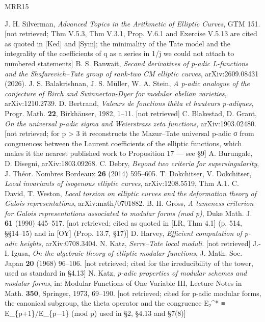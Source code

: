 \documentclass[11pt,a4paper]{article}
\theoremstyle{named}
\begin{document}
\begin{thebibliography}{MRR15}

 J. H. Silverman, \textit{Advanced Topics in the Arithmetic of Elliptic Curves}, GTM 151. [not retrieved; Thm V.5.3, Thm V.3.1, Prop. V.6.1 and Exercise V.5.13 are cited as quoted in [Ked] and [Sym]; the minimality of the Tate model and the integrality of the coefficients of q as a series in 1/j we could not attach to numbered statements]
 B. S. Banwait, \textit{Second derivatives of p-adic L-functions and the Shafarevich–Tate group of rank-two CM elliptic curves}, arXiv:2609.08431 (2026).
 J. S. Balakrishnan, J. S. Müller, W. A. Stein, \textit{A p-adic analogue of the conjecture of Birch and Swinnerton-Dyer for modular abelian varieties}, arXiv:1210.2739.
 D. Bertrand, \textit{Valeurs de fonctions thêta et hauteurs p-adiques}, Progr. Math. \textbf{22}, Birkhäuser, 1982, 1–11. [not retrieved]
 C. Blakestad, D. Grant, \textit{On the universal p-adic sigma and Weierstrass zeta functions}, arXiv:1903.02480. [not retrieved; for p \textgreater{} 3 it reconstructs the Mazur–Tate universal p-adic σ from congruences between the Laurent coefficients of the elliptic functions, which makes it the nearest published work to Proposition 17 — see §9]
 A. Burungale, D. Disegni, arXiv:1803.09268.
 C. Debry, \textit{Beyond two criteria for supersingularity}, J. Théor. Nombres Bordeaux \textbf{26} (2014) 595–605.
 T. Dokchitser, V. Dokchitser, \textit{Local invariants of isogenous elliptic curves}, arXiv:1208.5519, Thm A.1.
 C. David, T. Weston, \textit{Local torsion on elliptic curves and the deformation theory of Galois representations}, arXiv:math/0701882.
 B. H. Gross, \textit{A tameness criterion for Galois representations associated to modular forms (mod p)}, Duke Math. J. \textbf{61} (1990) 445–517. [not retrieved; cited as quoted in [LR, Thm 4.1] (p. 514, §§14–15) and in [OY] (Prop. 13.7, §17)]
 D. Harvey, \textit{Efficient computation of p-adic heights}, arXiv:0708.3404.
 N. Katz, \textit{Serre–Tate local moduli}. [not retrieved]
 J.-I. Igusa, \textit{On the algebraic theory of elliptic modular functions}, J. Math. Soc. Japan \textbf{20} (1968) 96–106. [not retrieved; cited for the irreducibility of the tower, used as standard in §4.13]
 N. Katz, \textit{p-adic properties of modular schemes and modular forms}, in: Modular Functions of One Variable III, Lecture Notes in Math. \textbf{350}, Springer, 1973, 69–190. [not retrieved; cited for p-adic modular forms, the canonical subgroup, the theta operator and the congruence E₂\textasciicircum{}* ≡ E\_\{p+1\}/E\_\{p−1\} (mod p) used in §2, §4.13 and §7(8)]

\end{thebibliography}
\end{document}

